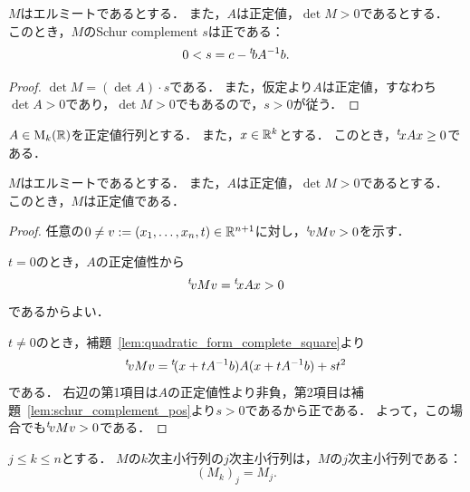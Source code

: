 \begin{lemma}
  \label{lem:schur_complement_pos}
  \leanok
  $M$はエルミートであるとする．
  また，$A$は正定値，$\det M > 0$であるとする．
  このとき，$M$のSchur complement $s$は正である：
  \begin{equation}
    0 < s = c - {}^t\!b A^{-1} b.
  \end{equation}
\end{lemma}

\begin{proof}
  $\det M = (\det A) \cdot s$である．
  また，仮定より$A$は正定値，すなわち$\det A > 0$であり，$\det M > 0$でもあるので，$s > 0$が従う．
\end{proof}

\begin{lemma}
  \label{lem:posDef_dotProduct_nonneg}
  \leanok
  $A \in \operatorname{M}_k(\mathbb{R})$を正定値行列とする．
  また，$x \in \mathbb{R}^k$とする．
  このとき，${}^t\!x A x \ge 0$である．
\end{lemma}

\begin{theorem}
  \label{thm:posDef_of_leading_submatrix_posDef_and_det_pos}
  \leanok
  $M$はエルミートであるとする．
  また，$A$は正定値，$\det M > 0$であるとする．
  このとき，$M$は正定値である．
\end{theorem}

\begin{proof}
  任意の$0 \ne v := (x_1, \ldots, x_n, t) \in \mathbb{R}^{n+1}$に対し，${}^t\!v M v > 0$を示す．

  $t = 0$のとき，$A$の正定値性から
  \begin{equation}
    {}^t\!v M v = {}^t\!x A x > 0
  \end{equation}
  であるからよい．

  $t \ne 0$のとき，補題~\ref{lem:quadratic_form_complete_square}より
  \begin{equation}
    {}^t\!v M v = {}^t\!(x + t A^{-1} b) A (x + t A^{-1} b) + st^2
  \end{equation}
  である．
  右辺の第1項目は$A$の正定値性より非負，第2項目は補題~\ref{lem:schur_complement_pos}より$s > 0$であるから正である．
  よって，この場合でも${}^t\!v M v > 0$である．
\end{proof}

\begin{lemma}
  \label{lem:leadingSubmatrix_leadingSubmatrix}
  \leanok
  $j \le k \le n$とする．
  $M$の$k$次主小行列の$j$次主小行列は，$M$の$j$次主小行列である：
  \begin{equation}
    (M_k)_j = M_j.
  \end{equation}
\end{lemma}

